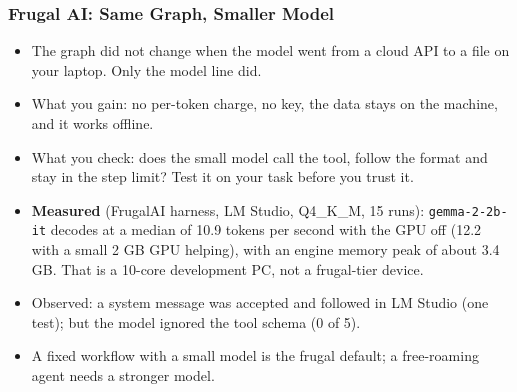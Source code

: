 \begin{frame}[fragile]\frametitle{Frugal AI: Same Graph, Smaller Model}
      \begin{itemize}
        \item The graph did not change when the model went from a cloud API to a file on your laptop. Only the model line did.
        \item What you gain: no per-token charge, no key, the data stays on the machine, and it works offline.
        \item What you check: does the small model call the tool, follow the format and stay in the step limit? Test it on your task before you trust it.
        \item \textbf{Measured} (FrugalAI harness, LM Studio, Q4\_K\_M, 15 runs): \texttt{gemma-2-2b-it} decodes at a median of 10.9 tokens per second with the GPU off (12.2 with a small 2 GB GPU helping), with an engine memory peak of about 3.4 GB. That is a 10-core development PC, not a frugal-tier device.
        \item Observed: a system message was accepted and followed in LM Studio (one test); but the model ignored the tool schema (0 of 5).
        \item A fixed workflow with a small model is the frugal default; a free-roaming agent needs a stronger model.
      \end{itemize}
\end{frame}


